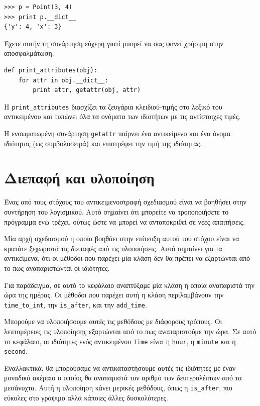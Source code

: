 \documentclass[10pt]{book}
\begin{document}
\begin{verbatim}
>>> p = Point(3, 4)
>>> print p.__dict__
{'y': 4, 'x': 3}
\end{verbatim}
%
Έχετε αυτήν τη συνάρτηση εύχερη γιατί μπορεί να σας φανεί χρήσιμη στην αποσφαλμάτωση: 

\begin{verbatim}
def print_attributes(obj):
    for attr in obj.__dict__:
        print attr, getattr(obj, attr)
\end{verbatim}
%
Η \verb"print_attributes" διασχίζει τα ζευγάρια κλειδιού-τιμής στο λεξικό του αντικειμένου και τυπώνει όλα τα
ονόματα των ιδιοτήτων με τις αντίστοιχες τιμές.

Η ενσωματωμένη συνάρτηση {\tt getattr} παίρνει ένα αντικείμενο και ένα όνομα ιδιότητας (ως συμβολοσειρά) και
επιστρέφει την τιμή της ιδιότητας.


\section{Διεπαφή και υλοποίηση}

Ένας από τους στόχους του αντικειμενοστραφή σχεδιασμού είναι να βοηθήσει στην συντήρηση του λογισμικού.
Αυτό σημαίνει ότι μπορείτε να τροποποιήσετε το πρόγραμμα ενώ τρέχει, ούτως ώστε να μπορεί να ανταποκριθεί
σε νέες απαιτήσεις.

Μία αρχή σχεδιασμού η οποία βοηθάει στην επίτευξη αυτού του στόχου είναι να κρατάτε ξεχωριστά τις
διεπαφές από τις υλοποιήσεις. Αυτό σημαίνει για τα αντικείμενα, ότι οι μέθοδοι που παρέχει μία κλάση 
δεν θα πρέπει να εξαρτώνται από το πως αναπαριστώνται οι ιδιότητες.

Για παράδειγμα, σε αυτό το κεφάλαιο αναπτύξαμε μία κλάση η οποία αναπαριστά την ώρα της ημέρας.
Οι μέθοδοι που παρέχει αυτή η κλάση περιλαμβάνουν την \verb"time_to_int", την \verb"is_after", και
την \verb"add_time".

Μπορούμε να υλοποιήσουμε αυτές τις μεθόδους με διάφορους τρόπους. Οι λεπτομέρειες τις υλοποίησης εξαρτώνται
από το πως αναπαριστούμε την ώρα. Σε αυτό το κεφάλαιο, οι ιδιότητες ενός αντικειμένου {\tt Time} είναι η
{\tt hour}, η {\tt minute} και η {\tt second}.

Εναλλακτικά, θα μπορούσαμε να αντικαταστήσουμε αυτές τις ιδιότητες με έναν μοναδικό ακέραιο ο οποίος
θα αναπαριστά τον αριθμό των δευτερολέπτων από τα μεσάνυχτα. Αυτή η υλοποίηση κάνει μερικές μεθόδους,
όπως η \verb"is_after", πιο εύκολες στο γράψιμο αλλά κάποιες άλλες δυσκολότερες.
\end{document}
